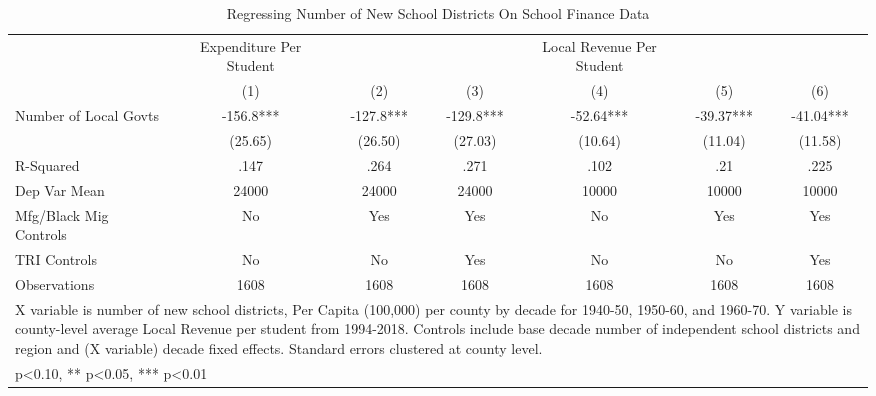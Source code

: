 \begin{table}[htbp]\centering
\def\sym#1{\ifmmode^{#1}\else\(^{#1}\)\fi}
\caption{Regressing Number of New School Districts On School Finance Data}
\begin{tabular}{l*{6}{c}}
\toprule
                    &Expenditure Per Student   &               &               &Local Revenue Per Student   &               &               \\
                    &\multicolumn{1}{c}{(1)}   &\multicolumn{1}{c}{(2)}   &\multicolumn{1}{c}{(3)}   &\multicolumn{1}{c}{(4)}   &\multicolumn{1}{c}{(5)}   &\multicolumn{1}{c}{(6)}   \\
\midrule
Number of Local Govts&      -156.8***&      -127.8***&      -129.8***&      -52.64***&      -39.37***&      -41.04***\\
                    &     (25.65)   &     (26.50)   &     (27.03)   &     (10.64)   &     (11.04)   &     (11.58)   \\
\midrule
R-Squared           &        .147   &        .264   &        .271   &        .102   &         .21   &        .225   \\
Dep Var Mean        &       24000   &       24000   &       24000   &       10000   &       10000   &       10000   \\
Mfg/Black Mig Controls&          No   &         Yes   &         Yes   &          No   &         Yes   &         Yes   \\
TRI Controls        &          No   &          No   &         Yes   &          No   &          No   &         Yes   \\
Observations        &        1608   &        1608   &        1608   &        1608   &        1608   &        1608   \\
\bottomrule
\multicolumn{7}{l}{\footnotesize X variable is number of new school districts, Per Capita (100,000) per county by decade for 1940-50, 1950-60, and 1960-70. Y variable is county-level average Local Revenue per student from 1994-2018. Controls include base decade number of independent school districts and region and (X variable) decade fixed effects. Standard errors clustered at county level.}\\
\multicolumn{7}{l}{\footnotesize * p<0.10, ** p<0.05, *** p<0.01}\\
\end{tabular}
\end{table}
